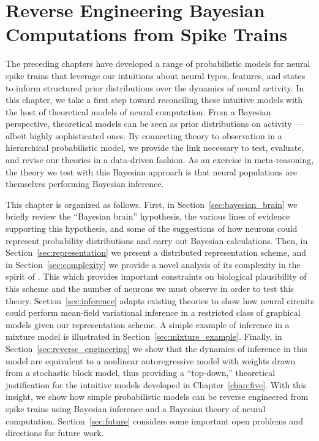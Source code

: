 \chapter{Reverse Engineering Bayesian Computations from Spike Trains}
\label{chap:nine}

The preceding chapters have developed a range of probabilistic models
for neural spike trains that leverage our intuitions about neural
types, features, and states to inform structured prior distributions over
the dynamics of neural activity. In this chapter, we take a
first step toward reconciling these intuitive models with the host of
theoretical models of neural computation. From a Bayesian perspective,
theoretical models can be seen as prior distributions on activity ---
albeit highly sophisticated ones. By connecting theory to observation
in a hierarchical probabilistic model, we provide the link
necessary to test, evaluate, and revise our theories in a
data-driven fashion.
As an exercise in meta-reasoning, the theory we test with this
Bayesian approach is that neural populations are themselves performing
Bayesian inference.

This chapter is organized as follows.  First, in
Section~\ref{sec:bayesian_brain} we briefly review the ``Bayesian
brain'' hypothesis, the various lines of evidence supporting this
hypothesis, and some of the suggestions of how neurons could represent
probability distributions and carry out Bayesian calculations.  Then,
in Section~\ref{sec:representation} we present a distributed representation
scheme, and in Section~\ref{sec:complexity} we provide a novel
analysis of its complexity in the spirit of
\citet{valiant1994circuits}. This which provides important constraints
on biological plausibility of this scheme and the number of neurons we
must observe in order to test this theory.
Section~\ref{sec:inference} adapts existing theories to show how
neural circuits could perform mean-field variational inference in a
restricted class of graphical models given our representation scheme.
A simple example of inference in a mixture model is illustrated in
Section~\ref{sec:mixture_example}.  Finally, in
Section~\ref{sec:reverse_engineering} we show that the dynamics of
inference in this model are equivalent to a nonlinear autoregressive model
with weights drawn from a stochastic block model, thus providing a
``top-down,'' theoretical justification for the intuitive models
developed in Chapter~\ref{chap:five}.  With this insight, we show how
simple probabilistic models can be reverse engineered from spike
trains using Bayesian inference and a
Bayesian theory of neural computation. Section~\ref{sec:future}
considers some important open problems and directions for future work.



